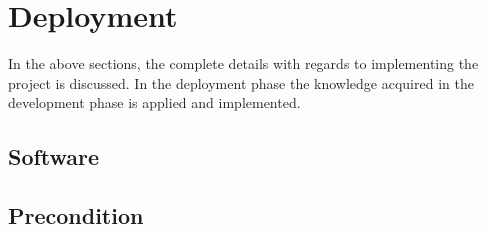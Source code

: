 




\section{Deployment}

In the above sections, the complete details with regards to implementing the project is discussed. In the deployment phase the knowledge acquired in the development phase is applied and implemented. 

%

\subsection{Software}

\subsection{Precondition}

